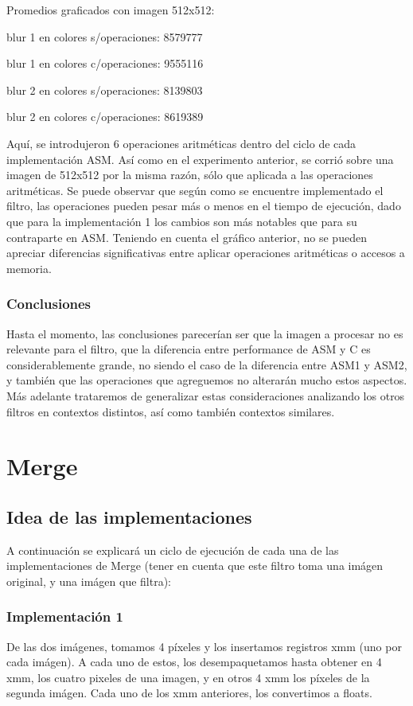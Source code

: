 \documentclass[a4paper]{article}
\begin{document}
Promedios graficados con imagen 512x512:

blur 1 en colores s/operaciones: 8579777

blur 1 en colores c/operaciones: 9555116

blur 2 en colores s/operaciones: 8139803

blur 2 en colores c/operaciones: 8619389

Aquí, se introdujeron 6 operaciones aritméticas dentro del ciclo de cada implementación ASM. Así como en el experimento anterior, se corrió sobre una imagen de 512x512 por la misma razón, sólo que aplicada a las operaciones aritméticas. Se puede observar que según como se encuentre implementado el filtro, las operaciones pueden pesar más o menos en el tiempo de ejecución, dado que para la implementación 1 los cambios son más notables que para su contraparte en ASM. Teniendo en cuenta el gráfico anterior, no se pueden apreciar diferencias significativas entre aplicar operaciones aritméticas o accesos a memoria.


\subsubsection{Conclusiones}

Hasta el momento, las conclusiones parecerían ser que la imagen a procesar no es relevante para el filtro, que la diferencia entre performance de ASM y C es considerablemente grande, no siendo el caso de la diferencia entre ASM1 y ASM2, y también que las operaciones que agreguemos no alterarán mucho estos aspectos. Más adelante trataremos de generalizar estas consideraciones analizando los otros filtros en contextos distintos, así como también contextos similares.


\newpage
\section{Merge}

\subsection{Idea de las implementaciones}
A continuación se explicará un ciclo de ejecución de cada una de las implementaciones de Merge (tener en cuenta que este filtro toma una imágen original, y una imágen que filtra):

\subsubsection{Implementación 1}
De las dos imágenes, tomamos 4 píxeles y los insertamos registros xmm (uno por cada imágen). A cada uno de estos, los desempaquetamos hasta obtener en 4 xmm, los cuatro pixeles de una imagen, y en otros 4 xmm los píxeles de la segunda imágen. Cada uno de los xmm anteriores, los convertimos a floats.
\vspace*{0.3cm}
\end{document}
